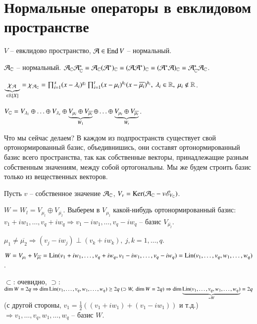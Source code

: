 \documentclass[main]{subfiles}
\begin{document}
\chapter{Нормальные операторы в евклидовом пространстве}

$V$ -- евклидово пространство, $\mathcal{A} \in \operatorname{End} V$ -- нормальный.

$\mathcal{A}_{\mathbb{C}}$ -- нормальный. $\mathcal{A}_{\mathbb{C}}\mathcal{A}_{\mathbb{C}}^* = \mathcal{A}_{\mathbb{C}}(\mathcal{A}^*)_{\mathbb{C}} = (\mathcal{A}\mathcal{A}^*)_{\mathbb{C}} = (\mathcal{A}^*\mathcal{A})_{\mathbb{C}} = \mathcal{A}_{\mathbb{C}}^*\mathcal{A}_{\mathbb{C}}$.

$\underbrace{\chi_{\mathcal{A}}}_{\in \mathbb{R}[X]} = \chi_{\mathcal{A}_{\mathbb{C}}} = \prod_{i=1}^s(x - \lambda_i)^{g_i} \prod_{i=1}^t(x - \mu_i)^{h_i} (x - \overline{\mu_i})^{h_i}, \ \lambda_i \in \mathbb{R}, \ \mu_i \not\in \mathbb{R}$.

$V_{\mathbb{C}} = V_{\lambda_1}\oplus\ldots\oplus V_{\lambda_s}\oplus \underbrace{V_{\mu_i}\oplus V_{\overline{\mu_i}}}_{W_1} \oplus \ldots \oplus\underbrace{V_{\mu_t} \oplus V_{\overline{\mu_t}}}_{W_t}$.


Что мы сейчас делаем? В каждом из подпространств существует свой ортонормированный базис, объедивнишись, они составят ортонормированный базис всего пространства, так как собственные векторы, принадлежащие 
разным собственным значениям, между собой ортогональны. Мы же будем строить базис только из вещественных векторов.

Пусть $v$ -- собственное значение $\mathcal{A}_{\mathbb{C}}$, $V_v = \operatorname{Ker} (\mathcal{A}_{\mathbb{C}} - v \mathscr{E}_{V_{\mathbb{C}}})$. 

$W = W_l = V_{\mu_l} \oplus V_{\overline{\mu_l}}$. Выберем в $V_{\mu_l}$ какой-нибудь ортонормированный базис: $v_1 + iw_1, \ldots, v_q + iw_q \Rightarrow
v_1 - iw_1, \ldots, v_q - iw_q$ -- базис $V_{\overline{\mu_l}}$.

$\mu_1 \neq \overline{\mu_2} \Rightarrow (v_j - iw_j) \perp (v_k + iw_k), \ j, k = 1, \ldots, q$.

$W = V_{\mu_l} + V_{\overline{\mu_l}} = \operatorname{Lin}(v_1 + iw_1, \ldots, v_q + iw_q, v_1 - iw_1, \ldots, v_q - iw_q) = \operatorname{Lin}(v_1, \ldots, v_q, w_1, \ldots, w_q)$. 

$\subset$: очевидно, $\supset$: $\dim W = 2q \Rightarrow \dim \operatorname{Lin} (v_1, \ldots, v_q, w_1, \ldots, w_q) \geq 2q \ (\supset W, \ \dim W = 2q) \Rightarrow
\dim \underbrace{\operatorname{Lin} (v_1, \ldots, v_q, w_1, \ldots, w_q)}_{=W} = 2q$ (с другой стороны, $v_1 = \frac{1}{2}((v_1 + iw_1) + (v_1 - iw_1))$ и т.д.) $\Rightarrow
v_1, \ldots, v_q, w_1, \ldots, w_q$ -- базис $W$.
\end{document}
